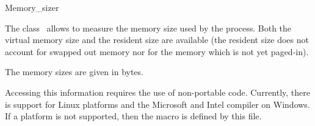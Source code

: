
\begin{ccRefClass}{Memory_sizer}

\ccDefinition

The class \ccRefName\ allows to measure the memory size used by the process.
Both the virtual memory size and the resident size are available (the resident
size does not account for swapped out memory nor for the memory which is not
yet paged-in).


\ccTypes
\ccThreeToTwo

The memory sizes are given in bytes.


\ccCreation

\ccPropagateThreeToTwoColumns


\ccOperations

\ccGlue
{}


\ccImplementation

Accessing this information requires the use of non-portable code.
Currently, there is support for Linux platforms and the Microsoft and Intel
compiler on Windows.  If a platform is not supported, then the macro
 is defined by this file.

\end{ccRefClass}
